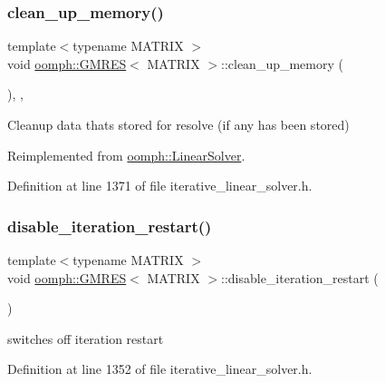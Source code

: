 \subsubsection{\texorpdfstring{clean\+\_\+up\+\_\+memory()}{clean\_up\_memory()}}
{\footnotesize\ttfamily template$<$typename M\+A\+T\+R\+IX $>$ \\
void \hyperlink{classoomph_1_1GMRES}{oomph\+::\+G\+M\+R\+ES}$<$ M\+A\+T\+R\+IX $>$\+::clean\+\_\+up\+\_\+memory (\begin{DoxyParamCaption}{ }\end{DoxyParamCaption})\hspace{0.3cm}{\ttfamily [inline]}, {\ttfamily [private]}, {\ttfamily [virtual]}}



Cleanup data that\textquotesingle{}s stored for resolve (if any has been stored) 



Reimplemented from \hyperlink{classoomph_1_1LinearSolver_a9d66f3262e80ca06a365f98216afd85f}{oomph\+::\+Linear\+Solver}.



Definition at line 1371 of file iterative\+\_\+linear\+\_\+solver.\+h.

\mbox{\label{classoomph_1_1GMRES_ad9020f172d5679012fb0328c8b9415f2}} 
\subsubsection{\texorpdfstring{disable\+\_\+iteration\+\_\+restart()}{disable\_iteration\_restart()}}
{\footnotesize\ttfamily template$<$typename M\+A\+T\+R\+IX $>$ \\
void \hyperlink{classoomph_1_1GMRES}{oomph\+::\+G\+M\+R\+ES}$<$ M\+A\+T\+R\+IX $>$\+::disable\+\_\+iteration\+\_\+restart (\begin{DoxyParamCaption}{ }\end{DoxyParamCaption})\hspace{0.3cm}{\ttfamily [inline]}}



switches off iteration restart 



Definition at line 1352 of file iterative\+\_\+linear\+\_\+solver.\+h.

